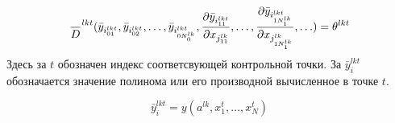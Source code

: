 \documentclass[a4paper,12pt]{article}
\begin{document}
  \begin{equation}
    {\over D}^{lkt} ( {\bar y}_{i^{lkt}_{01}}, {\bar y}_{i^{lkt}_{02}},
      \ldots, {\bar y}_{i^{lkt}_{0N^{lk}_0}},\frac{\partial {\bar
          y}_{i^{lkt}_{11}}}{\partial
        x_{j^{lk}_{11}}},\ldots,\frac{\partial {\bar
          y}_{i^{lkt}_{1N^{lk}_1}}}{\partial
        x_{j^{lk}_{1N^{lk}_1}}},\ldots) = \theta^{lkt}
  \end{equation}
  Здесь за $t$ обозначен индекс соответсвующей контрольной точки. За
  ${\bar y}_{i}^{lkt}$ обозначается значение полинома или его
  производной вычисленное в точке $t$.

  \begin{equation}
    {\bar y}_i^{lkt} = y(a^{lk},x^t_1,\ldots, x^t_N)
  \end{equation}
  
  
  
\end{document}
